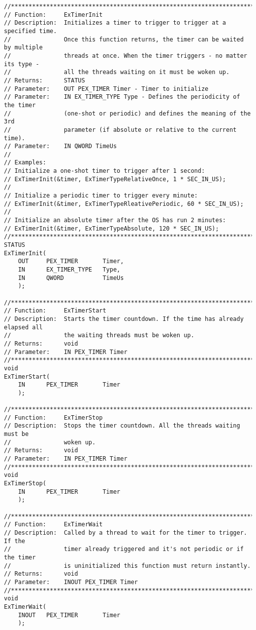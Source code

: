\begin{appendices}
\begin{lstlisting}[caption={Timer functions},label={lst:TimerFunc}]
//******************************************************************************
// Function:     ExTimerInit
// Description:  Initializes a timer to trigger to trigger at a specified time.
//               Once this function returns, the timer can be waited by multiple
//               threads at once. When the timer triggers - no matter its type -
//               all the threads waiting on it must be woken up.
// Returns:      STATUS
// Parameter:    OUT PEX_TIMER Timer - Timer to initialize
// Parameter:    IN EX_TIMER_TYPE Type - Defines the periodicity of the timer
//               (one-shot or periodic) and defines the meaning of the 3rd
//               parameter (if absolute or relative to the current time).
// Parameter:    IN QWORD TimeUs
//
// Examples:
// Initialize a one-shot timer to trigger after 1 second:
// ExTimerInit(&timer, ExTimerTypeRelativeOnce, 1 * SEC_IN_US);
//
// Initialize a periodic timer to trigger every minute:
// ExTimerInit(&timer, ExTimerTypeRleativePeriodic, 60 * SEC_IN_US);
//
// Initialize an absolute timer after the OS has run 2 minutes:
// ExTimerInit(&timer, ExTimerTypeAbsolute, 120 * SEC_IN_US);
//******************************************************************************
STATUS
ExTimerInit(
    OUT     PEX_TIMER       Timer,
    IN      EX_TIMER_TYPE   Type,
    IN      QWORD           TimeUs
    );

//******************************************************************************
// Function:     ExTimerStart
// Description:  Starts the timer countdown. If the time has already elapsed all
//               the waiting threads must be woken up.
// Returns:      void
// Parameter:    IN PEX_TIMER Timer
//******************************************************************************
void
ExTimerStart(
    IN      PEX_TIMER       Timer
    );

//******************************************************************************
// Function:     ExTimerStop
// Description:  Stops the timer countdown. All the threads waiting must be
//               woken up.
// Returns:      void
// Parameter:    IN PEX_TIMER Timer
//******************************************************************************
void
ExTimerStop(
    IN      PEX_TIMER       Timer
    );

//******************************************************************************
// Function:     ExTimerWait
// Description:  Called by a thread to wait for the timer to trigger. If the
//               timer already triggered and it's not periodic or if the timer
//               is uninitialized this function must return instantly.
// Returns:      void
// Parameter:    INOUT PEX_TIMER Timer
//******************************************************************************
void
ExTimerWait(
    INOUT   PEX_TIMER       Timer
    );


\end{lstlisting}
\end{appendices}
